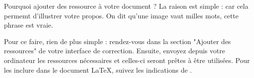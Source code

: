 Pourquoi ajouter des ressource à votre document ? La raison est simple : car cela permemt d'illustrer votre propos. On dit qu'une image vaut milles mots, cette phrase est vraie.

Pour ce faire, rien de plus simple : rendez-vous dans la section "Ajouter des ressources" de votre interface de correction. Ensuite, envoyez depuis votre ordinateur les ressources nécessaires et celles-ci seront prêtes à être utilisées. Pour les inclure dans le document \LaTeX, suivez les indications de .